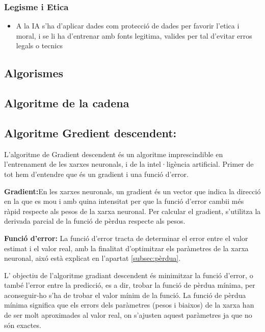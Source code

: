 \subsubsection{Legisme i Etica}
\begin{itemize}
 \item A la IA s'ha d'aplicar dades com protecció de dades per favorir l'etica i moral, i se li ha d'entrenar amb fonts legitima, valides per tal d'evitar erros legals o tecnics
\end{itemize}


\subsection{Algorismes}\label{subsec:Algorismes}
\subsection{Algoritme de la cadena}\label{subsec:cadena}

\subsection{Algoritme Gredient descendent:}\label{subsec:gradient}
L'algoritme de Gradient descendent és un algoritme imprescindible en l'entrenament de les xarxes neuronals, i de la intel·ligència artificial. Primer de tot hem d'entendre que és un gradient i una funció d'error.

\textbf{Gradient:}En les xarxes neuronals, un gradient és un vector que indica la direcció en la que es mou i amb quina intensitat per que la funció d'error cambii més ràpid respecte als pesos de la xarxa neuronal. Per calcular el gradient, s'utilitza la derivada parcial de la funció de pèrdua respecte als pesos.

\textbf{Funció d'error:} La funció d'error tracta de determinar el error entre el valor estimat i el valor real, amb la finalitat d'optimitzar els paràmetres de la xarxa neuronal, aixó està explicat en l'apartat \ref{subsec:pèrdua}.

L' objectiu de l'algoritme gradiant descendent és minimitzar la funció d'error, o també l'error entre la predicció, es a dir, trobar la funció de pèrdua mínima, per aconseguir-ho s'ha de trobar el valor mínim de la funció. La funció de pèrdua mínima significa que els errors dels paràmetres (pesos i biaixos) de la xarxa han de ser molt aproximades al valor real, on s'ajusten aquest paràmetres ja que no són exactes.

